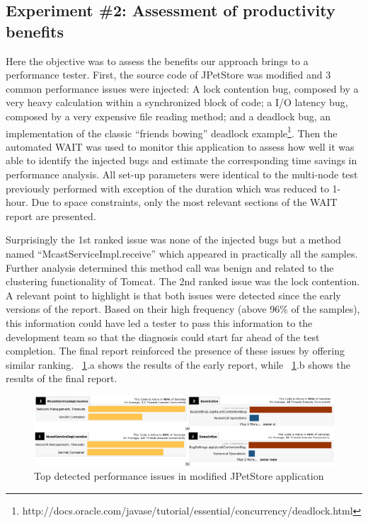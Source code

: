 \documentclass[runningheads,a4paper]{llncs}
\begin{document}
\vspace{-5pt}
\subsection{Experiment \#2: Assessment of productivity benefits}
\vspace{-2pt}

Here the objective was to assess the benefits our approach brings to a
performance tester. First, the source code of JPetStore was modified and 3
common performance issues were injected: A lock contention bug, composed by a
very heavy calculation within a synchronized block of code; a I/O latency bug, 
composed by a very expensive file reading method; and a deadlock bug, an
implementation of the classic ``friends bowing'' deadlock example\footnote{http://docs.oracle.com/javase/tutorial/essential/concurrency/deadlock.html}.
Then the automated WAIT was used to monitor this application to assess how well
it was able to identify the injected bugs and estimate the corresponding time
savings in performance analysis. All set-up parameters were identical to
the multi-node test previously performed with exception of the duration which
was reduced to 1-hour. Due to space constraints, only the most relevant sections
of the WAIT report are presented.

Surprisingly the 1st ranked issue was none of the injected bugs but a method
named ``McastServiceImpl.receive'' which appeared in practically all the
samples. Further analysis determined this method call was benign and related
to the clustering functionality of Tomcat. The 2nd ranked issue was the lock
contention. A relevant point to highlight is that both issues were detected
since the early versions of the report. Based on their high frequency (above
96\% of the samples), this information could have led a tester to pass this
information to the development team so that the diagnosis could start far ahead
of the test completion. The final report reinforced the presence of these issues 
by offering similar ranking. \figurename ~\ref{fig_run1_bugs12}.a shows the
results of the early report, while ~\ref{fig_run1_bugs12}.b shows the results of the final report.

\begin{figure}[!h]
\centering
\includegraphics[totalheight=.20\textheight,width=1\textwidth]{run1_issues12_short_long_run}
\caption{Top detected performance issues in modified JPetStore application}
\label{fig_run1_bugs12}
\end{figure}
\end{document}
